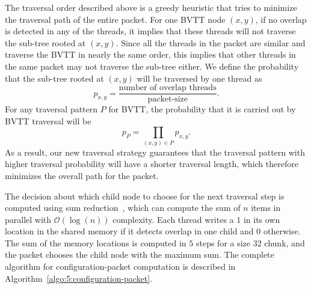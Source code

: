The traversal order described above is a greedy heuristic that tries to minimize the traversal path of the entire packet. For one BVTT node $(x,y)$, if no overlap is detected in any of the threads, it implies that these threads will not traverse the
sub-tree rooted at $(x,y)$. Since all the threads in the packet are similar and traverse the BVTT in nearly the same order,
this implies that other threads in the same packet may not traverse the sub-tree either. We define the probability that the sub-tree rooted at $(x,y)$ will be traversed by one thread as $$p_{x,y} = \frac{\text{number of overlap\ threads}}{\text{packet-size}}.$$ For any traversal pattern $P$ for BVTT, the probability that it is carried out by BVTT traversal will be $$p_P = \prod_{(x,y)\in P} p_{x,y}.$$
As a result, our new traversal strategy guarantees
that the traversal pattern with higher traversal probability will have a shorter traversal length, which therefore minimizes the overall
path for the packet.

The decision about which child node to choose for the next traversal step is computed using sum reduction~\cite{Mark:2009:sdk},
which can compute the sum of $n$ items in parallel with  $\mathcal{O}(\log(n))$ complexity. Each thread writes a $1$ in its own location in
the shared memory if it detects overlap in one child and $0$ otherwise. The sum of the memory locations is computed in
$5$ steps for  a size $32$ chunk, and the packet chooses the child node with the maximum sum. The complete algorithm for configuration-packet computation is described in Algorithm~\ref{algo:5:configuration-packet}.

